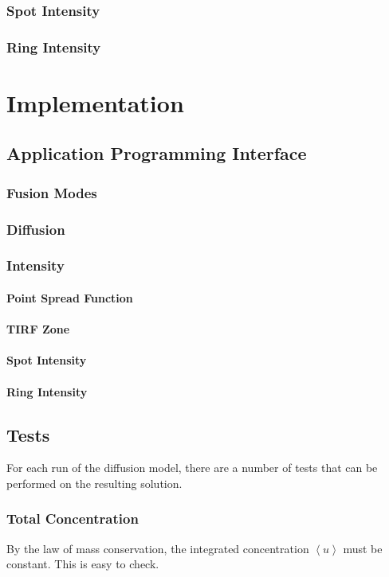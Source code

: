 \documentclass{report}
\newcommand\Angle[1]{{ \left\langle{#1}\right\rangle }}
\begin{document}
\section{Spot Intensity}
\section{Ring Intensity}

\part{Implementation}
\chapter{Application Programming Interface}
\section{Fusion Modes}
\section{Diffusion}
\section{Intensity}
\subsection{Point Spread Function}
\subsection{TIRF Zone}
\subsection{Spot Intensity}
\subsection{Ring Intensity}

\chapter{Tests}
For each run of the diffusion model, there are a number of tests that can be performed on the resulting solution.

\section{Total Concentration}
By the law of mass conservation, the integrated concentration $\Angle{u}$ must be constant. This is easy to check.
\end{document}
